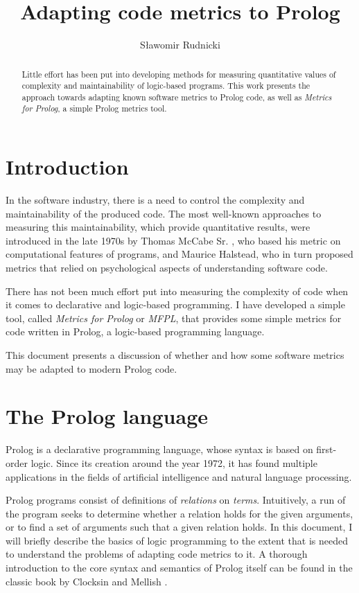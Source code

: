 \documentclass[11pt,a4paper,twoside]{article}
\author{Sławomir Rudnicki}
\title{Adapting code metrics to Prolog}
\date{}
\begin{document}
\maketitle
\begin{abstract}
  Little effort has been put into developing methods for measuring
  quantitative values of complexity and maintainability of logic-based
  programs. This work presents the approach towards adapting known
  software metrics to Prolog code, as well as \emph{Metrics for
    Prolog}, a simple Prolog metrics tool.
\end{abstract}
\begin{multicols}{2}

\section{Introduction}

In the software industry, there is a need to control the complexity
and maintainability of the produced code. The most well-known
approaches to measuring this maintainability, which provide
quantitative results, were introduced in the late 1970s by Thomas
McCabe Sr. \cite{mccabe}, who based his metric on computational
features of programs, and Maurice Halstead, who in turn proposed
metrics that relied on psychological aspects of understanding software
code.

There has not been much effort put into measuring the complexity of
code when it comes to declarative and logic-based programming. I have
developed a simple tool, called \emph{Metrics for Prolog} or
\emph{MFPL}, that provides some simple metrics for code written in
Prolog, a logic-based programming language. 

This document presents a discussion of whether and how some software
metrics may be adapted to modern Prolog code.

\section{The Prolog language}

Prolog is a declarative programming language, whose syntax is based on
first-order logic. Since its creation around the year 1972, it has
found multiple applications in the fields of artificial intelligence
and natural language processing.

Prolog programs consist of definitions of \emph{relations} on
\emph{terms}. Intuitively, a run of the program seeks to determine
whether a relation holds for the given arguments, or to find a set of
arguments such that a given relation holds. In this document, I will
briefly describe the basics of logic programming to the extent that is
needed to understand the problems of adapting code metrics to it. A
thorough introduction to the core syntax and semantics of Prolog
itself can be found in the classic book by Clocksin and Mellish
\cite{clocksin}.


\end{multicols}
\end{document}

